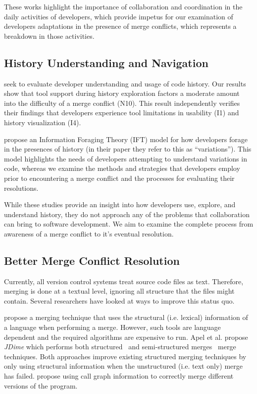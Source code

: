 These works highlight the importance of collaboration and coordination in the daily activities of developers, which provide impetus for our examination of developers adaptations in the presence of merge conflicts, which represents a breakdown in those activities.

\subsection{History Understanding and Navigation}

\citet{Mihai_lenses} seek to evaluate developer understanding and usage of code history. 
Our results show that tool support during history exploration factors a moderate amount into the difficulty of a merge conflict (N10). 
This result independently verifies their findings that developers experience tool limitations in usability (I1) and history visualization (I4).

\citet{ragavan_pfis-v_2017} propose an Information Foraging Theory (IFT) model for how developers forage in the presences of history (in their paper they refer to this as ``variations'').
This model highlights the needs of developers attempting to understand variations in code, whereas we examine the methods and strategies that developers employ prior to encountering a merge conflict and the processes for evaluating their resolutions.

While these studies provide an insight into how developers use, explore, and understand history, they do not approach any of the problems that collaboration can bring to software development.
We aim to examine the complete process from awareness of a merge conflict to it's eventual resolution.

\subsection{Better Merge Conflict Resolution}

Currently, all version control systems treat source code files as text.
Therefore, merging is done at a textual level, ignoring all structure that the files might contain.
Several researchers have looked at ways to improve this status quo.

\citet{westfechtel_structure-oriented_1991} propose a merging technique that uses the structural (i.e. lexical) information of a language when performing a merge. However, such tools are language dependent and the required algorithms are expensive to run.
Apel et al. propose \emph{JDime} which performs both structured~\cite{apel_structured_2012-1} and semi-structured merges~\cite{apel_semistructured_2011} merge techniques.
Both approaches improve existing structured merging techniques by only using structural information when the unstructured (i.e. text only) merge has failed.
\citet{binkley_program_1995} propose using call graph information to correctly merge different versions of the program.

